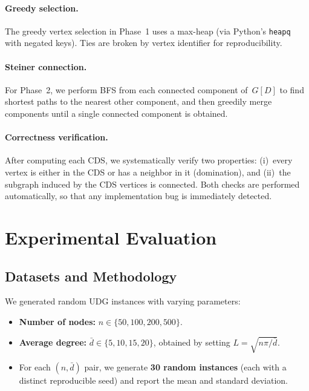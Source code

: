 \documentclass[11pt,a4paper]{article}
\begin{document}
\paragraph{Greedy selection.}
The greedy vertex selection in Phase~1 uses a max-heap (via Python's
\texttt{heapq} with negated keys).  Ties are broken by vertex identifier
for reproducibility.

\paragraph{Steiner connection.}
For Phase~2, we perform BFS from each connected component of~$G[D]$ to find
shortest paths to the nearest other component, and then greedily merge
components until a single connected component is obtained.

\paragraph{Correctness verification.}
After computing each CDS, we systematically verify two properties:
(i)~every vertex is either in the CDS or has a neighbor in it (domination),
and (ii)~the subgraph induced by the CDS vertices is connected.  Both checks
are performed automatically, so that any implementation bug is immediately
detected.

\section{Experimental Evaluation}\label{sec:experiments}

\subsection{Datasets and Methodology}

We generated random UDG instances with varying parameters:

\begin{itemize}[nosep]
  \item \textbf{Number of nodes:} $n \in \{50, 100, 200, 500\}$.
  \item \textbf{Average degree:} $\bar{d} \in \{5, 10, 15, 20\}$, obtained
        by setting $L = \sqrt{n \pi / \bar{d}}$.
  \item For each $(n, \bar{d})$ pair, we generate \textbf{30 random instances}
        (each with a distinct reproducible seed) and report the mean and
        standard deviation.
\end{itemize}
\end{document}
